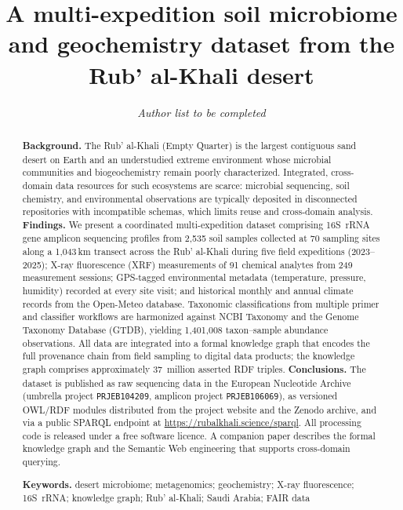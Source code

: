 \documentclass[11pt,a4paper]{article}
\title{A multi-expedition soil microbiome and geochemistry dataset
  from the Rub' al-Khali desert}
\author{\textit{Author list to be completed}}
\date{}
\begin{document}
\maketitle

\begin{abstract}
\noindent
\textbf{Background.} The Rub' al-Khali (Empty Quarter) is the largest
contiguous sand desert on Earth and an understudied extreme environment
whose microbial communities and biogeochemistry remain poorly
characterized. Integrated, cross-domain data resources for such
ecosystems are scarce: microbial sequencing, soil chemistry, and
environmental observations are typically deposited in disconnected
repositories with incompatible schemas, which limits reuse and
cross-domain analysis.
\textbf{Findings.} We present a coordinated multi-expedition dataset
comprising 16S~rRNA gene amplicon sequencing profiles from 2{,}535 soil
samples collected at 70 sampling sites along a 1{,}043\,km transect
across the Rub' al-Khali during five field expeditions
(2023--2025); X-ray fluorescence (XRF) measurements of 91 chemical
analytes from 249 measurement sessions; GPS-tagged environmental
metadata (temperature, pressure, humidity) recorded at every site
visit; and historical monthly and annual climate records from the
Open-Meteo database. Taxonomic classifications from multiple primer
and classifier workflows are harmonized against NCBI Taxonomy and the
Genome Taxonomy Database (GTDB), yielding 1{,}401{,}008 taxon--sample
abundance observations. All data are integrated into a formal
knowledge graph that encodes the full provenance chain from field
sampling to digital data products; the knowledge graph comprises
approximately 37~million asserted RDF triples.
\textbf{Conclusions.} The dataset is published as raw sequencing data
in the European Nucleotide Archive (umbrella project
\texttt{PRJEB104209}, amplicon project \texttt{PRJEB106069}), as
versioned OWL/RDF modules distributed from the project website and the
Zenodo archive, and via a public SPARQL endpoint at
\url{https://rubalkhali.science/sparql}. All processing code is
released under a free software licence. A companion paper describes
the formal knowledge graph and the Semantic Web engineering that
supports cross-domain querying.

\vspace{0.5em}
\noindent\textbf{Keywords.} desert microbiome; metagenomics;
geochemistry; X-ray fluorescence; 16S~rRNA; knowledge graph;
Rub' al-Khali; Saudi Arabia; FAIR data
\end{abstract}
\end{document}
